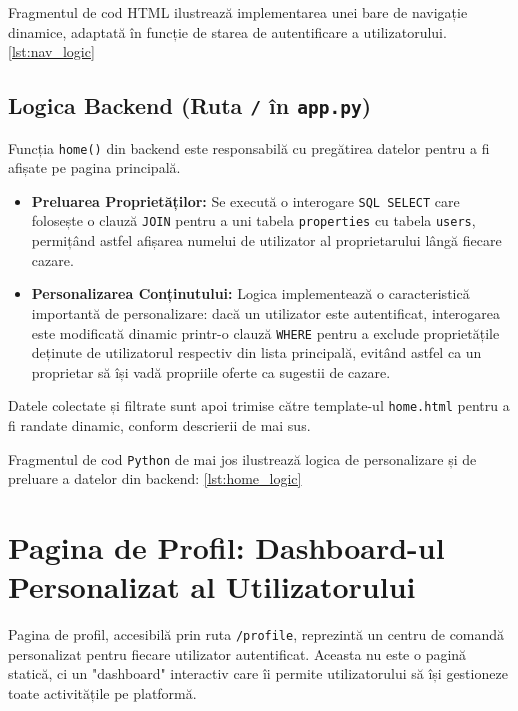 \documentclass[12pt, a4paper, oneside, romanian]{teza-upb}
\begin{document}
Fragmentul de cod HTML ilustrează implementarea unei bare de navigație dinamice, adaptată în funcție de starea de autentificare a utilizatorului. \ref{lst:nav_logic}

\subsection{Logica Backend (Ruta \texttt{/} în \texttt{app.py})}
Funcția \texttt{home()} din backend este responsabilă cu pregătirea datelor pentru a fi afișate pe pagina principală.
\begin{itemize}
	\item \textbf{Preluarea Proprietăților:} Se execută o interogare \texttt{SQL SELECT} care folosește o clauză \texttt{JOIN} pentru a uni tabela \texttt{properties} cu tabela \texttt{users}, permițând astfel afișarea numelui de utilizator al proprietarului lângă fiecare cazare.
	\item \textbf{Personalizarea Conținutului:} Logica implementează o caracteristică importantă de personalizare: dacă un utilizator este autentificat, interogarea este modificată dinamic printr-o clauză \texttt{WHERE} pentru a exclude proprietățile deținute de utilizatorul respectiv din lista principală, evitând astfel ca un proprietar să își vadă propriile oferte ca sugestii de cazare.
\end{itemize}
Datele colectate și filtrate sunt apoi trimise către template-ul \texttt{home.html} pentru a fi randate dinamic, conform descrierii de mai sus.

Fragmentul de cod \texttt{Python} de mai jos ilustrează logica de personalizare și de preluare a datelor din backend:  \ref{lst:home_logic}




\section{Pagina de Profil: Dashboard-ul Personalizat al Utilizatorului}
Pagina de profil, accesibilă prin ruta \texttt{/profile}, reprezintă un centru de comandă personalizat pentru fiecare utilizator autentificat. Aceasta nu este o pagină statică, ci un "dashboard" interactiv care îi permite utilizatorului să își gestioneze toate activitățile pe platformă.
\end{document}
